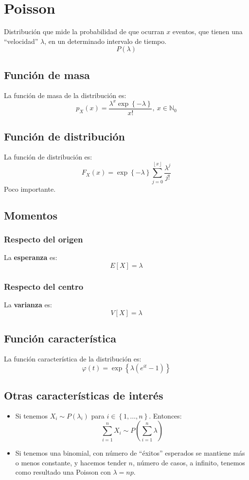 \section{Poisson}
\label{sec:poisson}
Distribución que mide la probabilidad de que ocurran $x$ eventos, que tienen una ``velocidad'' $\lambda$, en un determinado intervalo de tiempo.
\[
P\left( \lambda \right)
\]

\subsection{Función de masa}
La función de masa de la distribución es:
\[
p_X \left( x \right) = \frac{\lambda^x \exp\left\{ -\lambda \right\}}{x!},\ x \in \mathbb{N}_0
\]

\subsection{Función de distribución}
La función de distribución es:
\[
F_X\left( x \right) = \exp\left\{ -\lambda \right\}\sum_{j=0}^{\left\lfloor x \right\rfloor} \frac{\lambda^j}{j!} 
\]
Poco importante.

\subsection{Momentos}

\subsubsection*{Respecto del origen}
La \textbf{esperanza} es: 
\[
    E\left[ X \right] = \lambda
\]
\subsubsection*{Respecto del centro}
La \textbf{varianza} es:
\[
    V\left[ X \right] = \lambda
\]

\subsection{Función característica}
La función característica de la distribución es:
\[
\varphi\left( t \right) = \exp\left\{ \lambda\left( e^{it} - 1 \right) \right\}
\]

\subsection{Otras características de interés}
\begin{itemize}
    \item Si tenemos $X_i \sim P\left( \lambda_i \right)$ para $i \in\left\{ 1, \ldots, n \right\}$. Entonces:
    \[
    \sum_{i=1}^{n} X_i \sim P\left( \sum_{i=1}^{n} \lambda \right) 
    \]
    \item Si tenemos una binomial, con número de ``éxitos'' esperados se mantiene más o menos constante, y hacemos tender $n$, número de casos, a infinito, tenemos como resultado una Poisson con $\lambda = np$.
\end{itemize}

